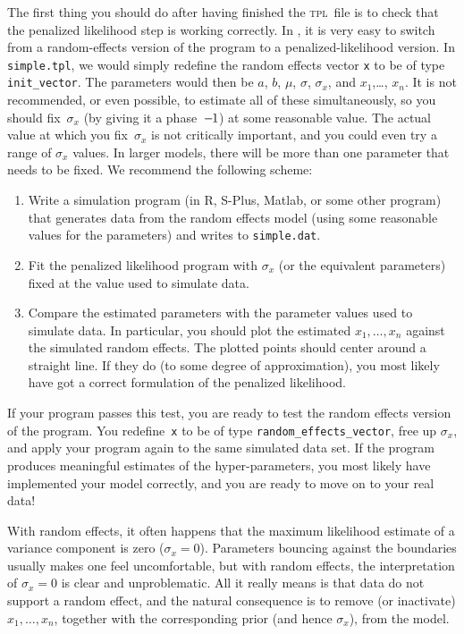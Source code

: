 \documentclass{admbmanual}
\begin{document}
The first thing you should do after having finished the \textsc{tpl}~file is to
check that the penalized likelihood step is working correctly. In \scAB, it is
very easy to switch from a random-effects version of the program to a
penalized-likelihood version. In \texttt{simple.tpl}, we would simply redefine
the random effects vector \texttt{x} to be of type \texttt{init\_vector}. The
parameters would then be $a$, $b$, $\mu $, $\sigma $, $\sigma_{x}$, and
$x_{1}$,\ldots , $x_{n}$. It is not recommended, or even possible, to estimate
all of these simultaneously, so you should fix~$\sigma_{x}$ (by giving it a
phase~$-\kern-.1em1$) at some reasonable value. The actual value at which you
fix~$\sigma_{x}$ is not critically important, and you could even try a range of
$\sigma_{x}$ values. In larger models, there will be more than one parameter
that needs to be fixed. We recommend the following scheme:
\begin{enumerate}
\item Write a simulation program (in R, S-Plus, Matlab, or some other
program) that generates data from the random effects model (using some
reasonable values for the parameters) and writes to \texttt{simple.dat}.

\item Fit the penalized likelihood program with $\sigma_{x}$ (or the
equivalent parameters) fixed at the value used to simulate data.

\item Compare the estimated parameters with the parameter values used to
simulate data. In particular, you should plot the estimated $x_{1},\ldots,x_{n}$
against the simulated random effects. The plotted points should center
around a straight line. If they do (to some degree of approximation), you
most likely have got a correct formulation of the penalized likelihood.
\end{enumerate}
If your program passes this test, you are ready to test the random effects
version of the program. You redefine~\texttt{x} to be of type
\texttt{random\_effects\_vector}, free up $\sigma_{x}$, and apply your program
again to the same simulated data set. If the program produces meaningful
estimates of the hyper-parameters, you most likely have implemented your model
correctly, and you are ready to move on to your real data!

With random effects, it often happens that the maximum likelihood estimate of a
variance component is zero ($\sigma_{x}=0$). Parameters bouncing against the
boundaries usually makes one feel uncomfortable, but with random effects, the
interpretation of $\sigma_{x}=0$ is clear and unproblematic. All it really means
is that data do not support a random effect, and the natural consequence is to
remove (or inactivate) $x_{1},\ldots ,x_{n}$, together with the corresponding
prior (and hence $\sigma_{x}$), from the model.
\end{document}
